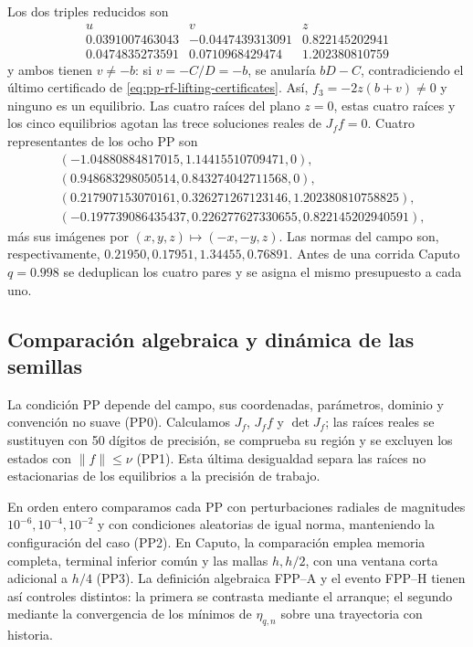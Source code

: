 Los dos triples reducidos son
\[
 \begin{array}{c|rr}
 u&v&z\\\hline
 0.0391007463043&-0.0447439313091&0.822145202941\\
 0.0474835273591& 0.0710968429474&1.202380810759
 \end{array}
\]
y ambos tienen \(v\ne-b\): si \(v=-C/D=-b\), se anularía
\(bD-C\), contradiciendo el último certificado de
\cref{eq:pp-rf-lifting-certificates}. Así,
\(f_3=-2z(b+v)\ne0\) y ninguno es un equilibrio.
Las cuatro raíces del plano \(z=0\), estas cuatro raíces y los cinco
equilibrios agotan las trece soluciones reales de \(J_ff=0\). Cuatro
representantes de los ocho PP son
\begin{align}
 &( -1.04880884817015, 1.14415510709471, 0),\\
 &( 0.948683298050514, 0.843274042711568, 0),\\
 &( 0.217907153070161, 0.326271267123146, 1.202380810758825),\\
 &( -0.197739086435437, 0.226277627330655, 0.822145202940591),
\end{align}
más sus imágenes por \((x,y,z)\mapsto(-x,-y,z)\). Las normas del campo son,
respectivamente, \(0.21950,0.17951,1.34455,0.76891\). Antes de una corrida
Caputo \(q=0.998\) se deduplican los cuatro pares y se asigna el mismo
presupuesto a cada uno.

\subsection{Comparación algebraica y dinámica de las semillas}

La condición PP depende del campo, sus coordenadas, parámetros, dominio y
convención no suave (PP0). Calculamos \(J_f\), \(J_ff\) y
\(\det J_f\); las raíces reales se sustituyen con 50 dígitos de precisión,
se comprueba su región y se excluyen los estados con \(\|f\|\le\nu\)
(PP1). Esta última desigualdad separa las raíces no estacionarias de los
equilibrios a la precisión de trabajo.

En orden entero comparamos cada PP con perturbaciones radiales de magnitudes
\(10^{-6},10^{-4},10^{-2}\) y con condiciones aleatorias de igual norma,
manteniendo la configuración del caso (PP2). En Caputo, la comparación
emplea memoria completa, terminal inferior común y las mallas \(h,h/2\),
con una ventana corta adicional a \(h/4\) (PP3). La definición algebraica
FPP--A y el evento FPP--H tienen así controles distintos: la primera se
contrasta mediante el arranque; el segundo mediante la convergencia de los
mínimos de \(\eta_{q,n}\) sobre una trayectoria con historia.

